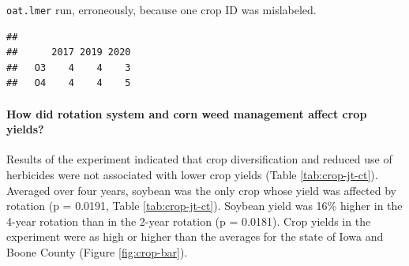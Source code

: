\documentclass[
]{article}
\author{}
\date{\vspace{-2.5em}}
\newenvironment{Shaded}{\begin{snugshade}}{\end{snugshade}}
\newcommand{\FunctionTok}[1]{\textcolor[rgb]{0.13,0.29,0.53}{\textbf{#1}}}
\newcommand{\NormalTok}[1]{#1}
\newcommand{\SpecialCharTok}[1]{\textcolor[rgb]{0.81,0.36,0.00}{\textbf{#1}}}
\begin{document}
\texttt{oat.lmer} run, erroneously, because one crop ID was mislabeled.

\begin{Shaded}
\end{Shaded}

\begin{verbatim}
##     
##      2017 2019 2020
##   O3    4    4    3
##   O4    4    4    5
\end{verbatim}

\paragraph*{How did rotation system and corn weed management affect crop yields?}\label{how-did-rotation-system-and-corn-weed-management-affect-crop-yields}

Results of the experiment indicated that crop diversification and reduced use of herbicides were not associated with lower crop yields (Table \ref{tab:crop-jt-ct}). Averaged over four years, soybean was the only crop whose yield was affected by rotation (p = 0.0191, Table \ref{tab:crop-jt-ct}). Soybean yield was 16\% higher in the 4-year rotation than in the 2-year rotation (p = 0.0181). Crop yields in the experiment were as high or higher than the averages for the state of Iowa and Boone County (Figure \ref{fig:crop-bar}).
\end{document}
